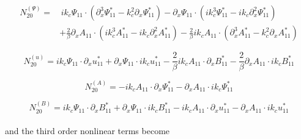 \documentclass{emulateapj}
\newcommand{\beq}{\begin{equation}}
\newcommand{\eeq}{\end{equation}}
\begin{document}
\beq
\begin{split}
N_{20}^{(\Psi)} = & \, i k_c \Psi_{11} \cdot \left(\partial_x^3 \Psi_{11}^* - k_c^2 \partial_x \Psi_{11}^*\right) - \partial_x \Psi_{11} \cdot \left(i k_c^3 \Psi_{11}^* - i k_c \partial_x^2 \Psi_{11}^*\right) \\
& +\frac{2}{\beta} \partial_x A_{11} \cdot \left(i k_c^3 A_{11}^* - i k_c \partial_x^2 A_{11}^* \right) - \frac{2}{\beta} i k_c A_{11} \cdot \left(\partial_x^3 A_{11}^* - k_c^2 \partial_x A_{11}^*\right)
\end{split}
\eeq

\beq
N_{20}^{(u)} = i k_c \Psi_{11} \cdot \partial_x u_{11}^* + \partial_x \Psi_{11} \cdot i k_c u_{11}^* - \frac{2}{\beta} i k_c A_{11} \cdot \partial_x B_{11}^* - \frac{2}{\beta} \partial_x A_{11} \cdot i k_c B_{11}^*
\eeq

\beq
N_{20}^{(A)} = - i k_c A_{11} \cdot \partial_x \Psi_{11}^* - \partial_x A_{11} \cdot i k_c \Psi_{11}^*
\eeq

\beq
N_{20}^{(B)} = i k_c \Psi_{11} \cdot \partial_x B_{11}^* + \partial_x \Psi_{11} \cdot i k_c B_{11}^* - i k_c A_{11} \cdot \partial_x u_{11}^* - \partial_x A_{11} \cdot i k_c u_{11}^*
\eeq \\

and the third order nonlinear terms become \\
\end{document}
